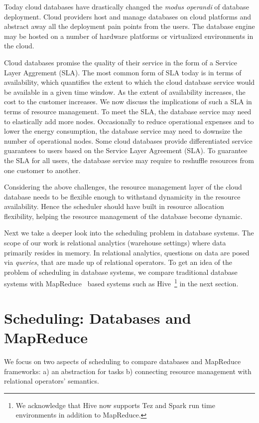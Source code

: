 Today cloud databases have drastically changed the \textit{modus operandi} of database deployment.
Cloud providers host and manage databases on cloud platforms and abstract away all the deployment pain points from the users.
The database engine may be hosted on a number of hardware platforms or virtualized environments in the cloud.

Cloud databases promise the quality of their service in the form of a Service Layer Aggrement (SLA).
The most common form of SLA today is in terms of availability, which quantifies the extent to which the cloud database service would be available in a given time window. 
As the extent of availability increases, the cost to the customer increases.
We now discuss the implications of such a SLA in terms of resource management.
To meet the SLA, the database service may need to elastically add more nodes. 
Occasionally to reduce operational expenses and to lower the energy consumption, the database service may need to downsize the number of operational nodes.
Some cloud databases provide differentiated service guarantees to users based on the Service Layer Agreement (SLA). 
To guarantee the SLA for all users, the database service may require to reshuffle resources from one customer to another. 

Considering the above challenges, the resource management layer of the cloud database needs to be flexible enough to withstand dynamicity in the resource availability.
Hence the scheduler should have built in resource allocation flexibility, helping the resource management of the database become dynamic.

Next we take a deeper look into the scheduling problem in database systems.
The scope of our work is relational analytics (warehouse settings) where data primarily resides in memory. 
In relational analytics, questions on data are posed via \textit{queries}, that are made up of relational operators. 
To get an idea of the problem of scheduling in database systems, we compare traditional database systems with MapReduce~\cite{mapreduce} based systems such as Hive~\cite{thusoo2010hive}\footnote{We acknowledge that Hive now supports Tez and Spark run time environments in addition to MapReduce.} in the next section.

\section{Scheduling: Databases and MapReduce}
We focus on two aspects of scheduling to compare databases and MapReduce frameworks: a) an abstraction for tasks b) connecting resource management with relational operators' semantics.

